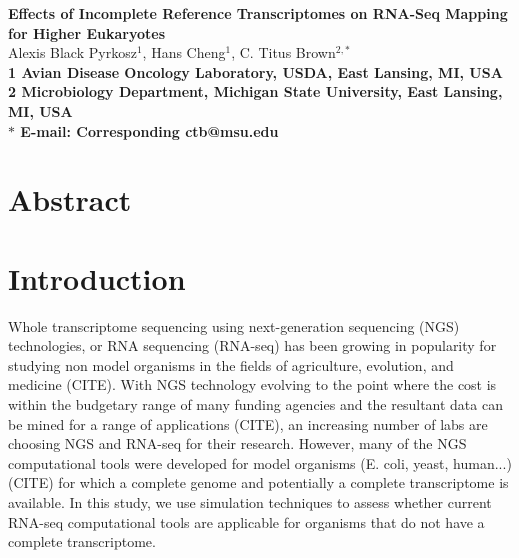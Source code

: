 \documentclass[10pt]{article}
\date{}
\begin{document}
\begin{flushleft}
{\Large
\textbf{Effects of Incomplete Reference Transcriptomes on RNA-Seq Mapping for Higher Eukaryotes}
}
\\
Alexis Black Pyrkosz$^{1}$, 
Hans Cheng$^{1}$, 
C. Titus Brown$^{2,\ast}$
\\
\bf{1} Avian Disease Oncology Laboratory, USDA, East Lansing, MI, USA
\\
\bf{2} Microbiology Department, Michigan State University, East Lansing, MI, USA
\\
$\ast$ E-mail: Corresponding ctb@msu.edu
\end{flushleft}

\section*{Abstract}


\section*{Introduction}




Whole transcriptome sequencing using next-generation sequencing (NGS) technologies, or RNA sequencing (RNA-seq) has been growing in popularity for studying non model organisms in the fields of agriculture, evolution, and medicine (CITE).  With NGS technology evolving to the point where the cost is within the budgetary range of many funding agencies and the resultant data can be mined for a range of applications (CITE), an increasing number of labs are choosing NGS and RNA-seq for their research.  However, many of the NGS computational tools were developed for model organisms (E. coli, yeast, human...) (CITE) for which a complete genome and potentially a complete transcriptome is available.  In this study, we use simulation techniques to assess whether current RNA-seq computational tools are applicable for organisms that do not have a complete transcriptome.
\end{document}
